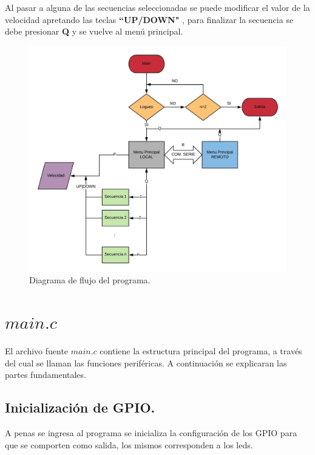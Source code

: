 \documentclass[11pt, a4paper]{article}
\begin{document}
Al pasar a alguna de las secuencias seleccionadas se puede modificar el valor de la velocidad  apretando las teclas \textbf{``UP/DOWN"} , para finalizar la secuencia se debe presionar \textbf{Q} y se vuelve al menú principal.
\begin{figure}[H]
	\centering
	\includegraphics[width = \textwidth]{Imagenes/dflujo.jpg}
	\caption{Diagrama de flujo del programa.}
	\label{dflujo}
\end{figure}


\clearpage %

\section {$main.c$}
El archivo fuente $main.c$ contiene la estructura principal del programa, a través del cual se llaman las funciones periféricas. A continuación se explicaran las partes fundamentales.

\subsection{Inicialización de GPIO.}


A penas se ingresa al programa se inicializa la configuración de los GPIO para que se comporten como salida, los mismos corresponden a los leds. 
\\
\end{document}
